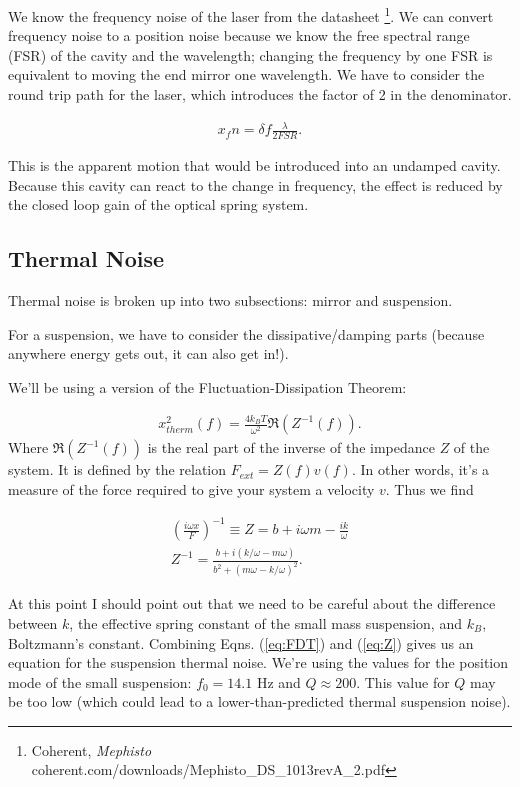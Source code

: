 We know the frequency noise of the laser from the datasheet \footnote{Coherent,  \textit{Mephisto} coherent.com/downloads/Mephisto\_DS\_1013revA\_2.pdf}.  We can convert frequency noise to a position noise because we know the free spectral range (FSR) of the cavity and the wavelength; changing the frequency by one FSR is equivalent to moving the end mirror one wavelength.  We have to consider the round trip path for the laser, which introduces the factor of 2 in the denominator.

\begin{eqnarray}
x_fn = \delta f \frac{\lambda}{2 FSR}.
\label{eq:deltaf}
\end{eqnarray}

This is the apparent motion that would be introduced into an undamped cavity.  Because this cavity can react to the change in frequency, the effect is reduced by the closed loop gain of the optical spring system.

\subsection{Thermal Noise}
Thermal noise is broken up into two subsections: mirror and suspension.

For a suspension, we have to consider the dissipative/damping parts (because anywhere energy gets out, it can also get in!).

We'll be using a version of the Fluctuation-Dissipation Theorem:

\begin{eqnarray}
x_{therm}^2(f)=\frac{4 k_B T}{\omega^2} \mathfrak{R}(Z^{-1}(f)).
\label{eq:FDT}
\end{eqnarray}
Where $\mathfrak{R}(Z^{-1}(f))$ is the real part of the inverse of the impedance $Z$ of the system.  It is defined by the relation $F_{ext}=Z(f)v(f)$.  In other words, it's a measure of the force required to give your system a velocity $v$.  Thus we find

\begin{eqnarray}
\left(\frac{i \omega x}{F}\right)^{-1} \equiv Z=b+i \omega m -\frac{i k}{\omega} \\Z^{-1} = \frac{b+i(k/\omega-m\omega)}{b^2+(m\omega-k/\omega)^2	}. %
\label{eq:Z}
\end{eqnarray}

At this point I should point out that we need to be careful about the difference between $k$, the effective spring constant of the small mass suspension, and $k_B$, Boltzmann's constant.  Combining Eqns. (\ref{eq:FDT}) and (\ref{eq:Z}) gives us an equation for the suspension thermal noise.  We're using the values for the position mode of the small suspension: $f_0 = 14.1$ Hz and $Q \approx 200$.  This value for $Q$ may be too low (which could lead to a lower-than-predicted thermal suspension noise). 

